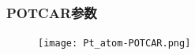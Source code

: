 \frame
{
	\frametitle{\textrm{POTCAR}参数}
\begin{figure}[h!]
\centering
\texttt{[image: Pt\_atom-POTCAR.png]}
\caption{\fontsize{6.2pt}{5.2pt}}%
\label{Pt_atom:POTCAR}
\end{figure}
}
